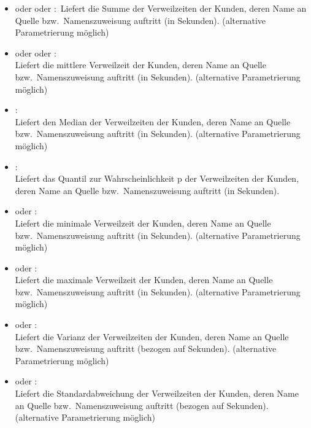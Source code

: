 \begin{itemize}

\item
{} oder  oder :\
Liefert die Summe der Verweilzeiten der Kunden, deren Name an Quelle bzw.\ Namenszuweisung  auftritt (in Sekunden).
(alternative Parametrierung möglich)

\item
{} oder  oder :\\
Liefert die mittlere Verweilzeit der Kunden, deren Name an Quelle bzw.\ Namenszuweisung \cm{id} auftritt (in Sekunden).
(alternative Parametrierung möglich)

\item
{}:\\
Liefert den Median der Verweilzeiten der Kunden, deren Name an Quelle bzw.\ Namenszuweisung  auftritt (in Sekunden).
(alternative Parametrierung möglich)

\item
{}:\\
Liefert das Quantil zur Wahrscheinlichkeit p der Verweilzeiten der Kunden, deren Name an Quelle bzw.\ Namenszuweisung  auftritt (in Sekunden).

\item
{} oder :\\
Liefert die minimale Verweilzeit der Kunden, deren Name an Quelle bzw.\ Namenszuweisung  auftritt (in Sekunden).
(alternative Parametrierung möglich)

\item
{} oder :\\
Liefert die maximale Verweilzeit der Kunden, deren Name an Quelle bzw.\ Namenszuweisung  auftritt (in Sekunden).
(alternative Parametrierung möglich)

\item
{} oder :\\
Liefert die Varianz der Verweilzeiten der Kunden, deren Name an Quelle bzw.\ Namenszuweisung  auftritt (bezogen auf Sekunden).
(alternative Parametrierung möglich)

\item
{} oder :\\
Liefert die Standardabweichung der Verweilzeiten der Kunden, deren Name an Quelle bzw.\ Namenszuweisung  auftritt (bezogen auf Sekunden).
(alternative Parametrierung möglich)


\end{itemize}
